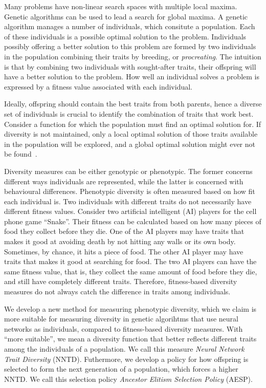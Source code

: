 Many problems have non-linear search spaces with multiple local maxima. Genetic algorithms can be used to lead a search for global maxima. A genetic algorithm manages a number of individuals, which consitute a population. Each of these individuals is a possible optimal solution to the problem. Individuals possibly offering a better solution to this problem are formed by two individuals in the population combining their traits by breeding, or \emph{procreating}. The intuition is that by combining two individuals with sought-after traits, their offspring will have a better solution to the problem. How well an individual solves a problem is expressed by a fitness value associated with each individual. 

Ideally, offspring should contain the best traits from both parents, hence a diverse set of individuals is crucial to identify the combination of traits that work best. Consider a function for which the population must find an optimal solution for. If diversity is not maintained, only a local optimal solution of those traits available in the population will be explored, and a global optimal solution might ever not be found~\cite{ursem2002diversity}.

Diversity measures can be either genotypic or phenotypic. The former concerns different ways individuals are represented, while the latter is concerned with behavioural differences. Phenotypic diversity is often measured based on how fit each individual is. Two individuals with different traits do not necessarily have different fitness values. Consider two artificial intelligent (AI) players for the cell phone game ``Snake''. Their fitness can be calculated based on how many pieces of food they collect before they die. One of the AI players may have traits that makes it good at avoiding death by not hitting any walls or its own body. Sometimes, by chance, it hits a piece of food. The other AI player may have traits that makes it good at searching for food. The two AI players can have the same fitness value, that is, they collect the same amount of food before they die, and still have completely different traits. Therefore, fitness-based diversity measures do not always catch the difference in traits among individuals.

We develop a new method for measuring phenotypic diversity, which we claim is more suitable for measuring diversity in genetic algorihtms that use neural networks as individuals, compared to fitness-based diversity measures. With ``more suitable'', we mean a diversity function that better reflects different traits among the individuals of a population. We call this measure \emph{Neural Network Trait Diversity} (NNTD). Futhermore, we develop a policy for how offspring is selected to form the next generation of a population, which forces a higher NNTD\@. We call this selection policy \emph{Ancestor Elitism Selection Policy} (AESP).

